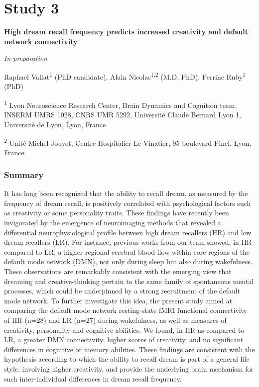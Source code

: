 \cleardoublepage

\chapter{Study 3}
\label{res:dmn-crea}

\textbf{{\large High dream recall frequency predicts increased creativity and default network connectivity}}

\hfill \emph{In preparation}

\bigskip

Raphael Vallat\textsuperscript{1} (PhD candidate), Alain Nicolas\textsuperscript{1,2} (M.D, PhD), Perrine Ruby\textsuperscript{1} (PhD)

\textsuperscript{1} Lyon Neuroscience Research Center, Brain Dynamics and Cognition team, INSERM UMRS 1028, CNRS UMR 5292, Université Claude Bernard Lyon 1, Université de Lyon, Lyon, France

\textsuperscript{2} Unité Michel Jouvet, Centre Hospitalier Le Vinatier, 95 boulevard Pinel, Lyon, France

\subsection*{Summary}
\label{res:dmn-crea:summary}
It has long been recognized that the ability to recall dream, as measured by the frequency of dream recall, is positively correlated with psychological factors such as creativity or some personality traits. These findings have recently been invigorated by the emergence of neuroimaging methods that revealed a differential neurophysiological profile between high dream recallers (HR) and low dream recallers (LR). For instance, previous works from our team showed, in HR compared to LR, a higher regional cerebral blood flow within core regions of the default mode network (DMN), not only during sleep but also during wakefulness. These observations are remarkably consistent with the emerging view that dreaming and creative-thinking pertain to the same family of spontaneous mental processes, which could be underpinned by a strong recruitment of the default mode network. To further investigate this idea, the present study aimed at comparing the default mode network resting-state fMRI functional connectivity of HR (n=28) and LR (n=27) during wakefulness, as well as measures of creativity, personality and cognitive abilities. We found, in HR as compared to LR, a greater DMN connectivity, higher scores of creativity, and no significant differences in cognitive or memory abilities. These findings are consistent with the hypothesis according to which the ability to recall dream is part of a general life style, involving higher creativity, and provide the underlying brain mechanism for such inter-individual differences in dream recall frequency.

